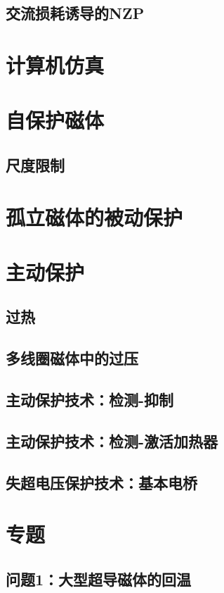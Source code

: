 \subsection{交流损耗诱导的NZP}

\section{计算机仿真}

\section{自保护磁体}
\subsection{尺度限制}

\section{孤立磁体的被动保护}


\section{主动保护}
\subsection{过热}
\subsection{多线圈磁体中的过压}
\subsection{主动保护技术：检测-抑制}
\subsection{主动保护技术：检测-激活加热器}
\subsection{失超电压保护技术：基本电桥}

\section{专题}
\subsection{问题1：大型超导磁体的回温}

